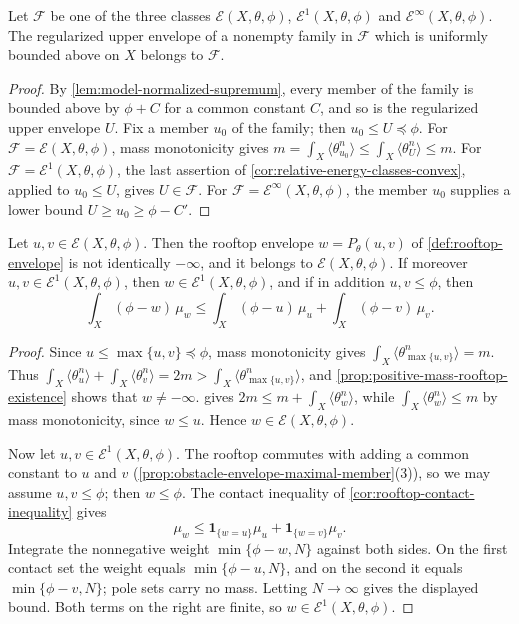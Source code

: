\begin{proposition}\label{prop:relative-energy-family-supremum}
Let $\mathcal F$ be one of the three classes $\mathcal E(X,\theta,\phi)$, $\mathcal E^1(X,\theta,\phi)$ and $\mathcal E^\infty(X,\theta,\phi)$. The regularized upper envelope of a nonempty family in $\mathcal F$ which is uniformly bounded above on $X$ belongs to $\mathcal F$.
\end{proposition}
\begin{proof}
By \cref{lem:model-normalized-supremum}, every member of the family is bounded above by $\phi+C$ for a common constant $C$, and so is the regularized upper envelope $U$. Fix a member $u_0$ of the family; then $u_0\leq U\preceq\phi$. For $\mathcal F=\mathcal E(X,\theta,\phi)$, mass monotonicity gives $m=\int_X\langle\theta_{u_0}^n\rangle\leq\int_X\langle\theta_U^n\rangle\leq m$. For $\mathcal F=\mathcal E^1(X,\theta,\phi)$, the last assertion of \cref{cor:relative-energy-classes-convex}, applied to $u_0\leq U$, gives $U\in\mathcal F$. For $\mathcal F=\mathcal E^\infty(X,\theta,\phi)$, the member $u_0$ supplies a lower bound $U\geq u_0\geq\phi-C'$.
\end{proof}

\begin{proposition}\label{prop:relative-finite-energy-rooftop-closure}
Let $u,v\in\mathcal E(X,\theta,\phi)$. Then the rooftop envelope $w=P_\theta(u,v)$ of \cref{def:rooftop-envelope} is not identically $-\infty$, and it belongs to $\mathcal E(X,\theta,\phi)$. If moreover $u,v\in\mathcal E^1(X,\theta,\phi)$, then $w\in\mathcal E^1(X,\theta,\phi)$, and if in addition $u,v\leq\phi$, then
\[
 \int_X(\phi-w)\,\mu_w
     \leq\int_X(\phi-u)\,\mu_u+\int_X(\phi-v)\,\mu_v.
\]
\end{proposition}
\begin{proof}
Since $u\leq\max\{u,v\}\preceq\phi$, mass monotonicity gives $\int_X\langle\theta_{\max\{u,v\}}^n\rangle=m$. Thus $\int_X\langle\theta_u^n\rangle+\int_X\langle\theta_v^n\rangle=2m>\int_X\langle\theta_{\max\{u,v\}}^n\rangle$, and \cref{prop:positive-mass-rooftop-existence} shows that $w\neq-\infty$.  gives $2m\leq m+\int_X\langle\theta_w^n\rangle$, while $\int_X\langle\theta_w^n\rangle\leq m$ by mass monotonicity, since $w\leq u$. Hence $w\in\mathcal E(X,\theta,\phi)$.

Now let $u,v\in\mathcal E^1(X,\theta,\phi)$. The rooftop commutes with adding a common constant to $u$ and $v$ (\cref{prop:obstacle-envelope-maximal-member}(3)), so we may assume $u,v\leq\phi$; then $w\leq\phi$. The contact inequality of \cref{cor:rooftop-contact-inequality} gives
\[
 \mu_w\leq\mathbf1_{\{w=u\}}\mu_u
                      +\mathbf1_{\{w=v\}}\mu_v.
\]
Integrate the nonnegative weight $\min\{\phi-w,N\}$ against both sides. On the first contact set the weight equals $\min\{\phi-u,N\}$, and on the second it equals $\min\{\phi-v,N\}$; pole sets carry no mass. Letting $N\to\infty$ gives the displayed bound. Both terms on the right are finite, so $w\in\mathcal E^1(X,\theta,\phi)$.
\end{proof}

